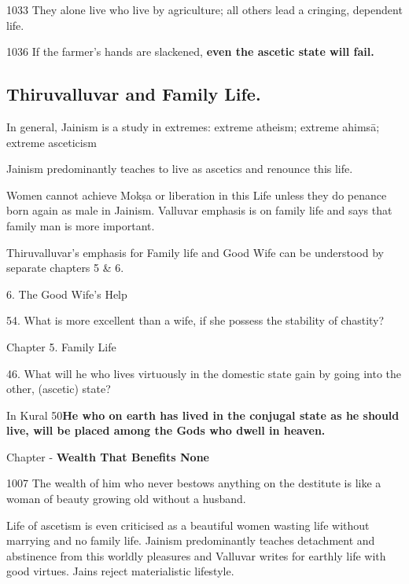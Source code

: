 1033 They alone live who live by agriculture; all others lead a cringing, dependent life.

1036  If the farmer's hands are slackened, \textbf{even the ascetic state will fail.}


\subsection*{Thiruvalluvar and Family Life.}

In general, Jainism is a study in extremes: extreme atheism; extreme ahimsā; extreme asceticism

Jainism predominantly teaches to live as ascetics and renounce this life.

Women cannot achieve Mokṣa or liberation in this Life unless they do penance born again as male in Jainism. Valluvar emphasis is on family life and says that family man is more important. 

Thiruvalluvar’s emphasis for Family life and Good Wife can be understood by separate chapters 5 \& 6.

6. The Good Wife’s Help

54. What is more excellent than a wife, if she possess the stability of chastity?

Chapter 5. Family Life

46. What will he who lives virtuously in the domestic state gain by going into the other, (ascetic) state?

In Kural 50\textbf{He who on earth has lived in the conjugal state as he should live, will be placed among the Gods who dwell in heaven.}

Chapter - \textbf{Wealth That Benefits None}

1007 The wealth of him who never bestows anything on the destitute is like a woman of beauty growing old without a husband.

Life of ascetism is even criticised as a beautiful women wasting life without marrying and no family life. Jainism predominantly teaches detachment and abstinence from this worldly pleasures and Valluvar writes for earthly life with good virtues. Jains reject materialistic lifestyle.


